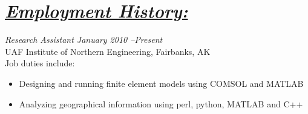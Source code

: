\documentclass[10pt, letterpaper]{article}
\begin{document}
\begin{comment}
Suggested by Lisa's dad, but not by Career Services.
I think this is largely irrelevant due to my possession of a bachelors degree.
\large\textit{High School Diploma \hfill May 2005}\normalsize \\
Susitna Valley Junior Senior High School\\
\emph{Graduated with a 3.73 GPA}

New section, trying it out
Currently canning this section but THAT'S OKAY
\section*{\underline{\textit{Projects:}}}
\large\textit{Super Four-Bar Explorer \hfill December 2008}\normalsize
\small\begin{itemize}
\item A program written in python that uses a Gauss-Newton unconstrained optimization algorithm to fit the path traced by a four bar linkage to a given set of points
\item Accompanied by a spreadsheet that illustrates four-bar linkage traced paths
\end{itemize}\normalsize\medskip

Another new section, recommended by Career Services. At worst, I have the
wording for it, amirite?
\section*{\underline{\textit{Service:}}}

ASME's web site, E-week volunteer

\large\textit{Society of Automotive Engineers, UAF
Chapter\hfill2009}\normalsize\\
\textit{Treasurer}
\end{comment}

\section*{\underline{\textit{Employment History:}}}

\large\textit{Research Assistant \hfill January 2010 --Present}\normalsize \\
UAF Institute of Northern Engineering, Fairbanks, AK\\
Job duties include:
\small\begin{itemize}
\item Designing and running finite element models using COMSOL and MATLAB
\item Analyzing geographical information using perl, python, MATLAB and C++
\end{itemize}\normalsize\medskip
\end{document}
